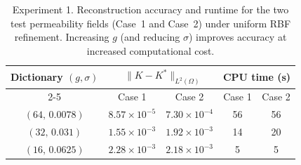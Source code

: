\documentclass[final,1p,times]{elsarticle}
\theoremstyle{plain}
\theoremstyle{definition}
\theoremstyle{remark}
\newcommand{\bx}{\mathbf{x}}
\begin{document}
\begin{table}[!h]
\centering
\begin{tabular}{|c|c|c|c|c|}
\hline
\multirow{2}{*}{{Dictionary $(g,\sigma)$}} &
\multicolumn{2}{c|}{{\ $\|K-K^*\|_{L^2(\Omega)}$}} &
\multicolumn{2}{c|}{{CPU time (s)}} \\ \cline{2-5}
 & {Case 1} & {Case 2} & {Case 1} & {Case 2}\\ \hline
$(64,\,0.0078)$  & $8.57 \times10^{-5}$ & $7.30 \times10^{-4}$  & 56 & 56  \\ \hline
$(32,\,0.031)$   & $1.55 \times10^{-3}$ & $1.92 \times10^{-3}$  & 14 & 20  \\ \hline
$(16,\,0.0625)$  & $2.28 \times10^{-3}$ & $2.18 \times10^{-3}$  & 5  & 5   \\ \hline
\end{tabular}
\caption{Experiment 1. Reconstruction accuracy and runtime for the two test permeability
fields (Case~1 and Case~2) under uniform RBF refinement. Increasing $g$ (and
reducing $\sigma$) improves accuracy at increased computational cost.}
\label{tab:recovery_results_combined}
\end{table}












\end{document}
